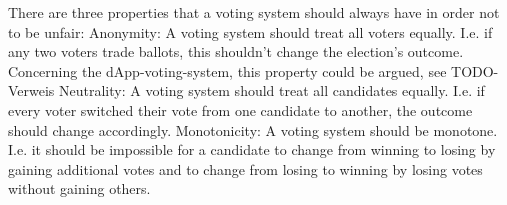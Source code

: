 There are three properties that a voting system should always have in order not to be unfair: 
Anonymity: A voting system should treat all voters equally. I.e. if any two voters trade ballots, this shouldn't change the election's outcome. \\
Concerning the dApp-voting-system, this property could be argued, see TODO-Verweis %
Neutrality: A voting system should treat all candidates equally. I.e. if every voter switched their vote from one candidate to another, the outcome should change accordingly. 
Monotonicity: A voting system should be monotone. I.e. it should be impossible for a candidate to change from winning to losing by gaining additional votes and to change from losing to winning by losing votes without gaining others. 

